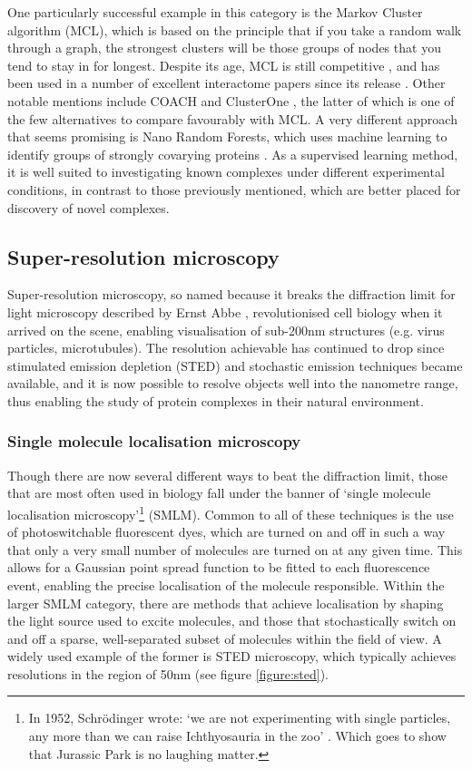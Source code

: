 \documentclass[a4paper,11pt,twoside,openright]{scrbook}
\begin{document}
One particularly successful example in this category is the Markov Cluster
algorithm \cite{VanDongen2000} (MCL), which is based on the principle that if
you take a random walk through a graph, the strongest clusters will be those
groups of nodes that you tend to stay in for longest. Despite its age, MCL is
still competitive \cite{Li2010}, and has been used in a number of excellent
interactome papers since its release \cite{Krogan2006,Wan2015}. Other notable
mentions include COACH and ClusterOne \cite{Wu2009,Nepusz2012}, the latter of
which is one of the few alternatives to compare favourably with MCL. A very
different approach that seems promising is Nano Random Forests, which uses
machine learning to identify groups of strongly covarying proteins
\cite{Montano-Gutierrez2017}. As a supervised learning method, it is well suited
to investigating known complexes under different experimental conditions, in
contrast to those previously mentioned, which are better placed for discovery of
novel complexes.

\subsection{Super-resolution microscopy}
Super-resolution microscopy, so named because it breaks the diffraction limit
for light microscopy described by Ernst Abbe \cite{Abbe1873}, revolutionised
cell biology when it arrived on the scene, enabling visualisation of sub-200nm
structures (e.g. virus particles, microtubules). The resolution achievable has
continued to drop since stimulated emission depletion \cite{Hell1994} (STED) and
stochastic emission techniques \cite{Rust2006,Hess2006,Betzig2006} became
available, and it is now possible to resolve objects well into the nanometre
range, thus enabling the study of protein complexes in their natural
environment.

\subsubsection{Single molecule localisation microscopy}
Though there are now several different ways to beat the diffraction limit, those
that are most often used in biology fall under the banner of `single molecule
localisation microscopy'\footnote{In 1952, Schrödinger wrote: `we are not
experimenting with single particles, any more than we can raise Ichthyosauria in
the zoo' \cite{Schrodinger1952}. Which goes to show that Jurassic Park is no
laughing matter.} (SMLM). Common to all of these techniques is the use of
photoswitchable fluorescent dyes, which are turned on and off in such a way that
only a very small number of molecules are turned on at any given time. This
allows for a Gaussian point spread function to be fitted to each fluorescence
event, enabling the precise localisation of the molecule responsible. Within the
larger SMLM category, there are methods that achieve localisation by shaping the
light source used to excite molecules, and those that stochastically switch on
and off a sparse, well-separated subset of molecules within the field of view. A
widely used example of the former is STED microscopy, which typically achieves
resolutions in the region of 50nm (see figure \ref{figure:sted}).
\end{document}
